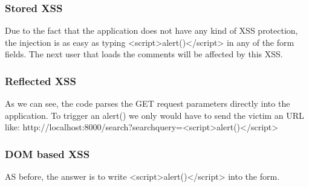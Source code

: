 \begin{Answer}[ref={websec-xss-types}]
	\subsubsection{Stored XSS}
	Due to the fact that the application does not have any kind of XSS protection, the injection is as easy as typing <script>alert()</script> in any of the form fields. The next user that loads the comments will be affected by this XSS.
	\subsubsection{Reflected XSS}
	As we can see, the code parses the GET request parameters directly into the application. To trigger an alert() we only would have to send the victim an URL like: http://localhost:8000/search?searchquery=<script>alert()</script>
	\subsubsection{DOM based XSS}
	AS before, the answer is to write <script>alert()</script> into the form.
\end{Answer}